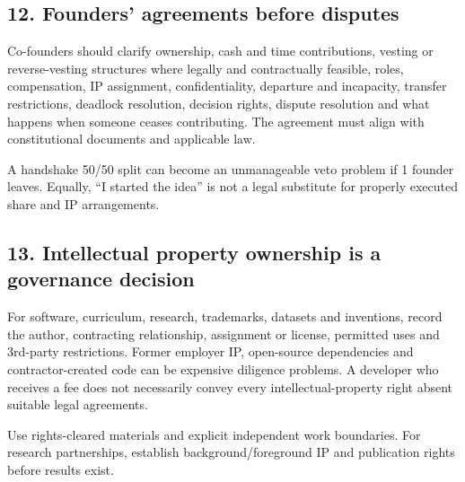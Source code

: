 \subsection{12. Founders' agreements before disputes}

Co-founders should clarify ownership, cash and time contributions, vesting or reverse-vesting structures where legally and contractually feasible, roles, compensation, IP assignment, confidentiality, departure and incapacity, transfer restrictions, deadlock resolution, decision rights, dispute resolution and what happens when someone ceases contributing. The agreement must align with constitutional documents and applicable law.

A handshake 50/50 split can become an unmanageable veto problem if 1 founder leaves. Equally, ``I started the idea'' is not a legal substitute for properly executed share and IP arrangements.

\subsection{13. Intellectual property ownership is a governance decision}

For software, curriculum, research, trademarks, datasets and inventions, record the author, contracting relationship, assignment or license, permitted uses and 3rd-party restrictions. Former employer IP, open-source dependencies and contractor-created code can be expensive diligence problems. A developer who receives a fee does not necessarily convey every intellectual-property right absent suitable legal agreements.

Use rights-cleared materials and explicit independent work boundaries. For research partnerships, establish background/foreground IP and publication rights before results exist.
